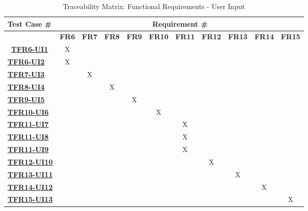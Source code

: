 \documentclass[12pt, titlepage]{article}
\begin{document}
\begin{landscape}
\begin{table}[H]
    \centering
    \begin{adjustbox}{width=1\textwidth}
    \begin{tabular}{l|cccccccccc}
        \textbf{Test Case \#} & \multicolumn{10}{c}{\textbf{Requirement \#}}\\
        \hline
        ~ & \textbf{FR6} & \textbf{FR7} & \textbf{FR8} & \textbf{FR9} & \textbf{FR10} & \textbf{FR11} & \textbf{FR12} & \textbf{FR13} & \textbf{FR14} & \textbf{FR15} \\\
        \hyperref[TFR6-UI1] \textbf{TFR6-UI1}  & X & ~ & ~ & ~ & ~ & ~ & ~ & ~ & ~ & ~ \\
        \hyperref[TFR6-UI2] \textbf{TFR6-UI2}  & X & ~ & ~ & ~ & ~ & ~ & ~ & ~ & ~ & ~ \\
        \hyperref[TFR7-UI3] \textbf{TFR7-UI3}  & ~ & X & ~ & ~ & ~ & ~ & ~ & ~ & ~ & ~ \\
        \hyperref[TFR8-UI4] \textbf{TFR8-UI4}  & ~ & ~ & X & ~ & ~ & ~ & ~ & ~ & ~ & ~ \\
        \hyperref[TFR9-UI5] \textbf{TFR9-UI5}  & ~ & ~ & ~ & X & ~ & ~ & ~ & ~ & ~ & ~ \\
        \hyperref[TFR10-UI6] \textbf{TFR10-UI6}  & ~ & ~ & ~ & ~ & X & ~ & ~ & ~ & ~ & ~ \\
        \hyperref[TFR11-UI7] \textbf{TFR11-UI7}  & ~ & ~ & ~ & ~ & ~ & X & ~ & ~ & ~ & ~ \\
        \hyperref[TFR11-UI8] \textbf{TFR11-UI8}  & ~ & ~ & ~ & ~ & ~ & X & ~ & ~ & ~ & ~ \\
        \hyperref[TFR11-UI9] \textbf{TFR11-UI9}  & ~ & ~ & ~ & ~ & ~ & X & ~ & ~ & ~ & ~ \\
        \hyperref[TFR12-UI10] \textbf{TFR12-UI10}  & ~ & ~ & ~ & ~ & ~ & ~ & X & ~ & ~ & ~ \\
        \hyperref[TFR13-UI11] \textbf{TFR13-UI11}  & ~ & ~ & ~ & ~ & ~ & ~ & ~ & X & ~ & ~ \\
        \hyperref[TFR14-UI12] \textbf{TFR14-UI12}  & ~ & ~ & ~ & ~ & ~ & ~ & ~ & ~ & X & ~ \\
        \hyperref[TFR15-UI13] \textbf{TFR15-UI13}  & ~ & ~ & ~ & ~ & ~ & ~ & ~ & ~ & ~ & X \\
    \end{tabular}
    \end{adjustbox}
    \caption{Traceability Matrix: Functional Requirements - User Input}
    \label{Traceability Matrix: Functional Requirements - User Input}
\end{table}


\end{landscape}
\end{document}
